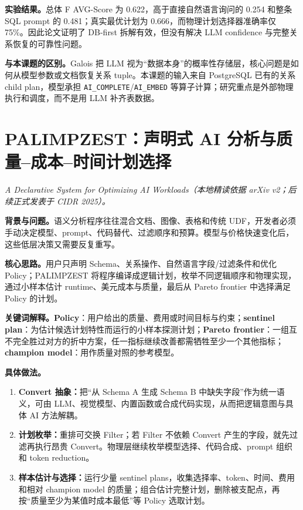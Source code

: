 \documentclass[10pt,a4paper]{ctexart}
\let\digestoriginalsection\section
\renewcommand{\section}{\Needspace{7\baselineskip}\digestoriginalsection}
\newcommand{\paperinfo}[1]{\textit{#1}\par}
\newcommand{\field}[1]{\par\noindent\textbf{#1。}\hspace{0.25em}}
\begin{document}
\field{实验结果}总体 F AVG-Score 为 0.622，高于直接自然语言询问的 0.254 和整条 SQL prompt 的 0.481；真实最优计划为 0.666，而物理计划选择器准确率仅 75\%。因此论文证明了 DB-first 拆解有效，但没有解决 LLM confidence 与完整关系恢复的可靠性问题。

\field{与本课题的区别}Galois 把 LLM 视为“数据本身”的概率性存储层，核心问题是如何从模型参数或文档恢复关系 tuple。本课题的输入来自 PostgreSQL 已有的关系 child plan，模型承担 \texttt{AI\_COMPLETE}/\texttt{AI\_EMBED} 等算子计算；研究重点是外部物理执行和调度，而不是用 LLM 补齐表数据。

\section{PALIMPZEST：声明式 AI 分析与质量--成本--时间计划选择}
\paperinfo{A Declarative System for Optimizing AI Workloads（本地精读依据 arXiv v2；后续正式发表于 CIDR 2025）。}

\field{背景与问题}语义分析程序往往混合文档、图像、表格和传统 UDF，开发者必须手动决定模型、prompt、代码替代、过滤顺序和预算。模型与价格快速变化后，这些低层决策又需要反复重写。

\field{核心思路}用户只声明 Schema、关系操作、自然语言字段/过滤条件和优化 Policy；PALIMPZEST 将程序编译成逻辑计划，枚举不同逻辑顺序和物理实现，通过小样本估计 runtime、美元成本与质量，最后从 Pareto frontier 中选择满足 Policy 的计划。

\field{关键词解释}\textbf{Policy}：用户给出的质量、费用或时间目标与约束；\textbf{sentinel plan}：为估计候选计划特性而运行的小样本探测计划；\textbf{Pareto frontier}：一组互不完全胜过对方的折中方案，任一指标继续改善都需牺牲至少一个其他指标；\textbf{champion model}：用作质量对照的参考模型。

\field{具体做法}
\begin{enumerate}
  \item \textbf{Convert 抽象：}把“从 Schema A 生成 Schema B 中缺失字段”作为统一语义，可由 LLM、视觉模型、内置函数或合成代码实现，从而把逻辑意图与具体 AI 方法解耦。
  \item \textbf{计划枚举：}重排可交换 Filter；若 Filter 不依赖 Convert 产生的字段，就先过滤再执行昂贵 Convert。物理层继续枚举模型选择、代码合成、prompt 组织和 token reduction。
  \item \textbf{样本估计与选择：}运行少量 sentinel plans，收集选择率、token、时间、费用和相对 champion model 的质量；组合估计完整计划，删除被支配点，再按“质量至少为某值时成本最低”等 Policy 选取计划。
\end{enumerate}
\end{document}
